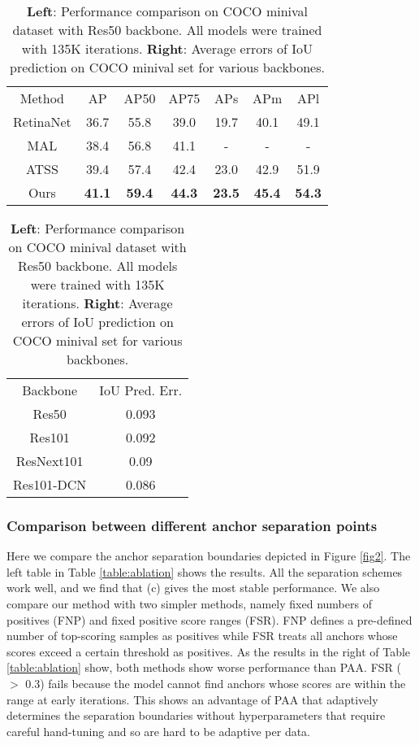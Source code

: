 \documentclass[runningheads]{llncs}
\begin{document}
\begin{table}[t]
\begin{center}
\caption {\textbf{Left}: Performance comparison on COCO minival dataset with Res50 backbone. All models were trained with 135K iterations. \textbf{Right}: Average errors of IoU prediction on COCO minival set for various backbones.}
\begin{minipage}{.6\linewidth}
\centering
\begin{tabular}{c|cccccc}
\hline\noalign{\smallskip}
Method & AP & AP50 & AP75 & APs & APm & APl \\
\noalign{\smallskip}
\hline
RetinaNet & 36.7 & 55.8 & 39.0 & 19.7 & 40.1 & 49.1\\
MAL\cite{mal} &  38.4 & 56.8 & 41.1 & - & - & -\\
ATSS\cite{atss} & 39.4 & 57.4 & 42.4 & 23.0 & 42.9 & 51.9\\
Ours & \textbf{41.1} & \textbf{59.4} & \textbf{44.3} & \textbf{23.5} & \textbf{45.4} & \textbf{54.3}\\
\hline
\end{tabular}
\label{table:val}
\end{minipage}\begin{minipage}{.4\linewidth}
\centering
\begin{tabular}{c|c}
\hline\noalign{\smallskip}
Backbone & IoU Pred. Err.\\
\noalign{\smallskip}
\hline
Res50 & 0.093\\
Res101 & 0.092\\
ResNext101 & 0.09\\
Res101-DCN & 0.086\\
\hline
\end{tabular}
\label{table:iou}
\end{minipage}\end{center}
\end{table}

\subsubsection{Comparison between different anchor separation points}
Here we compare the anchor separation boundaries depicted in Figure \ref{fig2}. The left table in Table \ref{table:ablation} shows the results. All the separation schemes work well, and we find that (c) gives the most stable performance. We also compare our method with two simpler methods, namely fixed numbers of positives (FNP) and fixed positive score ranges (FSR). FNP defines a pre-defined number of top-scoring samples as positives while FSR treats all anchors whose scores exceed a certain threshold as positives. As the results in the right of Table \ref{table:ablation} show, both methods show worse performance than PAA. FSR ($>$ 0.3) fails because the model cannot find anchors whose scores are within the range at early iterations. This shows an advantage of PAA that adaptively determines the separation boundaries without hyperparameters that require careful hand-tuning and so are hard to be adaptive per data.
\end{document}
